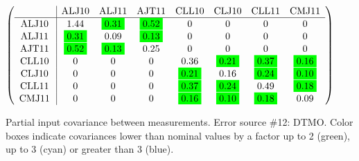 \begin{table}[H]
\scriptsize
\begin{center}
\renewcommand{\arraystretch}{1.1}
\begin{math}\left(\begin{array}{c|ccccccc}
 & \mathrm{ALJ10} & 
\mathrm{ALJ11} & 
\mathrm{AJT11} & 
\mathrm{CLL10} & 
\mathrm{CLJ10} & 
\mathrm{CLL11} & 
\mathrm{CMJ11} \\
\hline
\mathrm{ALJ10} \hspace*{2pt} &       1.44 &  \colorbox{Green1}{$      0.31$} &  \colorbox{Green1}{$      0.52$} &  0 &  0 &  0 &  0 \\
\mathrm{ALJ11} \hspace*{2pt} &  \colorbox{Green1}{$      0.31$} &       0.09 &  \colorbox{Green1}{$      0.13$} &  0 &  0 &  0 &  0 \\
\mathrm{AJT11} \hspace*{2pt} &  \colorbox{Green1}{$      0.52$} &  \colorbox{Green1}{$      0.13$} &       0.25 &  0 &  0 &  0 &  0 \\
\mathrm{CLL10} \hspace*{2pt} &  0 &  0 &  0 &       0.36 &  \colorbox{Green1}{$      0.21$} &  \colorbox{Green1}{$      0.37$} &  \colorbox{Green1}{$      0.16$} \\
\mathrm{CLJ10} \hspace*{2pt} &  0 &  0 &  0 &  \colorbox{Green1}{$      0.21$} &       0.16 &  \colorbox{Green1}{$      0.24$} &  \colorbox{Green1}{$      0.10$} \\
\mathrm{CLL11} \hspace*{2pt} &  0 &  0 &  0 &  \colorbox{Green1}{$      0.37$} &  \colorbox{Green1}{$      0.24$} &       0.49 &  \colorbox{Green1}{$      0.18$} \\
\mathrm{CMJ11} \hspace*{2pt} &  0 &  0 &  0 &  \colorbox{Green1}{$      0.16$} &  \colorbox{Green1}{$      0.10$} &  \colorbox{Green1}{$      0.18$} &       0.09 \\
\end{array}\right)\end{math}
\caption{Partial input covariance between measurements. Error source \#12: DTMO. Color boxes indicate covariances lower than nominal values by a factor up to 2 (green), up to 3 (cyan) or greater than 3 (blue).}
\renewcommand{\arraystretch}{1}
\end{center}
\end{table}
